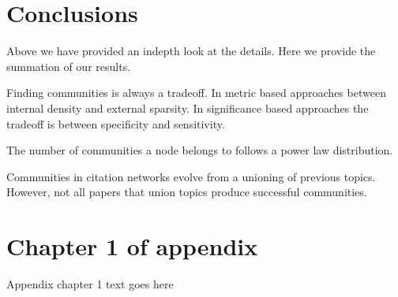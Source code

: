 \documentclass[phd,tocprelim]{cornell}
\begin{document}
\chapter{Conclusions}

Above we have provided an indepth look at the details.  Here we provide the summation of our results.

Finding communities is always a tradeoff.  In metric based approaches between internal density and external sparsity.  In significance based approaches the tradeoff is between specificity and sensitivity.

The number of communities a node belongs to follows a power law distribution.

Communities in citation networks evolve from a unioning of previous topics.  However, not all papers that union topics produce successful communities.

\cite{fort}
\cite{porter}
\cite{kanna}
\cite{newman}
\cite{duch}
\cite{blondel}
\cite{mishra}
\cite{jain}
\cite{zhang}
\cite{andersen}
\cite{capocci}
\cite{lanc:2009}
\cite{danon}
\cite{leskovec}
\cite{hui}
\cite{maiya}
\cite{lan:2008}
\cite{hastings}
\cite{leskovec:2008}
\cite{chen}
\cite{lanc:2010}
\cite{girvan}


\appendix
\chapter{Chapter 1 of appendix}
Appendix chapter 1 text goes here


\end{document}
